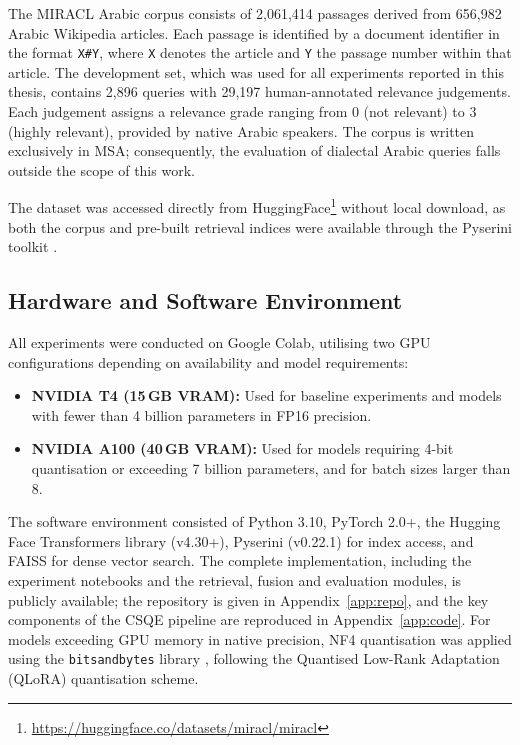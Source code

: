 The MIRACL Arabic corpus consists of 2,061,414 passages derived from 656,982 Arabic Wikipedia articles. Each passage is identified by a document identifier in the format \texttt{X\#Y}, where \texttt{X} denotes the article and \texttt{Y} the passage number within that article. The development set, which was used for all experiments reported in this thesis, contains 2,896 queries with 29,197 human-annotated relevance judgements. Each judgement assigns a relevance grade ranging from 0 (not relevant) to 3 (highly relevant), provided by native Arabic speakers. The corpus is written exclusively in MSA; consequently, the evaluation of dialectal Arabic queries falls outside the scope of this work.

The dataset was accessed directly from HuggingFace\footnote{\url{https://huggingface.co/datasets/miracl/miracl}} without local download, as both the corpus and pre-built retrieval indices were available through the Pyserini toolkit \cite{lin_2021_pyserini}.

\subsection{Hardware and Software Environment}
\label{sec:meth_hardware}

All experiments were conducted on Google Colab, utilising two GPU configurations depending on availability and model requirements:

\begin{itemize}
    \item \textbf{NVIDIA T4 (15\,GB VRAM):} Used for baseline experiments and models with fewer than 4 billion parameters in FP16 precision.
    \item \textbf{NVIDIA A100 (40\,GB VRAM):} Used for models requiring 4-bit quantisation or exceeding 7 billion parameters, and for batch sizes larger than 8.
\end{itemize}

The software environment consisted of Python 3.10, PyTorch 2.0+, the Hugging Face Transformers library (v4.30+), Pyserini (v0.22.1) for index access, and FAISS for dense vector search. The complete implementation, including the experiment notebooks and the retrieval, fusion and evaluation modules, is publicly available; the repository is given in Appendix~\ref{app:repo}, and the key components of the CSQE pipeline are reproduced in Appendix~\ref{app:code}. For models exceeding GPU memory in native precision, NF4 quantisation was applied using the \texttt{bitsandbytes} library \cite{dettmers_2023_qlora}, following the Quantised Low-Rank Adaptation (QLoRA) quantisation scheme.

